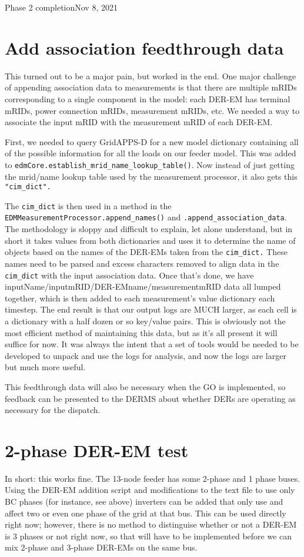 \begin{entry}{Phase 2 completion}{Nov 8, 2021}
    \section*{Add association feedthrough data}
    This turned out to be a major pain, but worked in the end. One major challenge of appending association data to
    measurements is that there are multiple mRIDs corresponding to a single component in the model: each DER-EM has
    terminal mRIDs, power connection mRIDs, measurement mRIDs, etc. We needed a way to associate the input mRID with
    the measurement mRID of each DER-EM.

    First, we needed to query GridAPPS-D for a new model dictionary containing all of the possible information for all
    the loads on our feeder model. This was added to \verb|edmCore.establish_mrid_name_lookup_table()|.
    Now instead of just getting the mrid/name lookup table used by the measurement processor, it also
    gets this \verb|"cim_dict".|

    The \verb|cim_dict| is then used in a method in the \verb|EDMMeasurementProcessor.append_names()| and
    \verb|.append_association_data|. The methodology is sloppy and difficult to explain, let alone understand,
    but in short it takes values from both dictionaries and uses it to determine the name of objects based on the
    names of the DER-EMs taken from the \verb|cim_dict.|
    These names need to be parsed and excess characters removed to align data in the
    \verb|cim_dict| with the input association data. Once that's done, we have
    inputName/inputmRID/DER-EMname/measurementmRID data all lumped together, which is then added to each
    measurement's value dictionary each timestep. The end result is that our output logs are MUCH larger, as each
    cell is a dictionary with a half dozen or so key/value pairs. This is obviously not the most efficient method of
    maintaining this data, but as it's all present it will suffice for now. It was always the intent that a set of
    tools would be needed to be developed to unpack and use the logs for analysis, and now the logs are larger but
    much more useful.

    This feedthrough data will also be necessary when the GO is implemented, so feedback can be presented to the DERMS
    about whether DERs are operating as necessary for the dispatch.

    \section*{2-phase DER-EM test}
    In short: this works fine. The 13-node feeder has some 2-phase and 1 phase buses. Using the DER-EM addition script
    and modifications to the text file to use only BC phases (for instance, see above) inverters can be added that only
    use and affect two or even one phase of the grid at that bus. This can be used directly right now; however, there
    is no method to distinguise whether or not a DER-EM is 3 phases or not right now, so that will have to be
    implemented before we can mix 2-phase and 3-phase DER-EMs on the same bus.


\end{entry}
